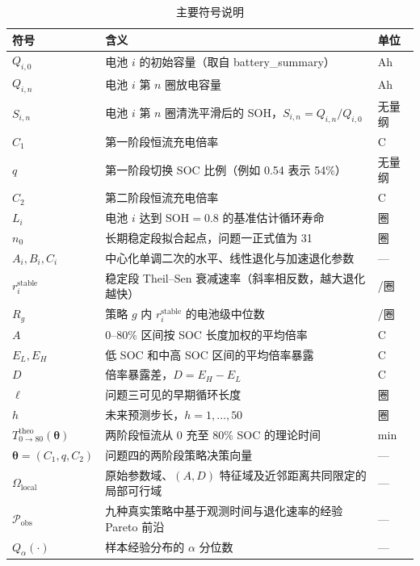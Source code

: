 \documentclass[withoutpreface]{cumcmthesis}
\newcommand{\SOH}{\mathrm{SOH}}
\begin{document}
\begin{table}[H]
\centering
\caption{主要符号说明}
\small
\begin{tabularx}{\textwidth}{lXl}
\toprule
符号 & 含义 & 单位 \\
\midrule
$Q_{i,0}$ & 电池 $i$ 的初始容量（取自 battery\_summary） & Ah \\
$Q_{i,n}$ & 电池 $i$ 第 $n$ 圈放电容量 & Ah \\
$S_{i,n}$ & 电池 $i$ 第 $n$ 圈清洗平滑后的 SOH，$S_{i,n}=Q_{i,n}/Q_{i,0}$ & 无量纲 \\
$C_1$ & 第一阶段恒流充电倍率 & C \\
$q$ & 第一阶段切换 SOC 比例（例如 0.54 表示 54\%） & 无量纲 \\
$C_2$ & 第二阶段恒流充电倍率 & C \\
$L_i$ & 电池 $i$ 达到 $\SOH=0.8$ 的基准估计循环寿命 & 圈 \\
$n_0$ & 长期稳定段拟合起点，问题一正式值为 31 & 圈 \\
$A_i,B_i,C_i$ & 中心化单调二次的水平、线性退化与加速退化参数 & --- \\
$r_i^{\mathrm{stable}}$ & 稳定段 Theil--Sen 衰减速率（斜率相反数，越大退化越快） & /圈 \\
$R_g$ & 策略 $g$ 内 $r_i^{\mathrm{stable}}$ 的电池级中位数 & /圈 \\
$A$ & 0--80\% 区间按 SOC 长度加权的平均倍率 & C \\
$E_L,E_H$ & 低 SOC 和中高 SOC 区间的平均倍率暴露 & C \\
$D$ & 倍率暴露差，$D=E_H-E_L$ & C \\
$\ell$ & 问题三可见的早期循环长度 & 圈 \\
$h$ & 未来预测步长，$h=1,\ldots,50$ & 圈 \\
$T_{0\rightarrow80}^{\mathrm{theo}}(\boldsymbol\theta)$ & 两阶段恒流从 0 充至 80\% SOC 的理论时间 & min \\
$\boldsymbol\theta=(C_1,q,C_2)$ & 问题四的两阶段策略决策向量 & --- \\
$\Omega_{\mathrm{local}}$ & 原始参数域、$(A,D)$ 特征域及近邻距离共同限定的局部可行域 & --- \\
$\mathcal P_{\mathrm{obs}}$ & 九种真实策略中基于观测时间与退化速率的经验 Pareto 前沿 & --- \\
$Q_\alpha(\cdot)$ & 样本经验分布的 $\alpha$ 分位数 & --- \\
\bottomrule
\end{tabularx}
\label{tab:symbols}
\end{table}
\end{document}
